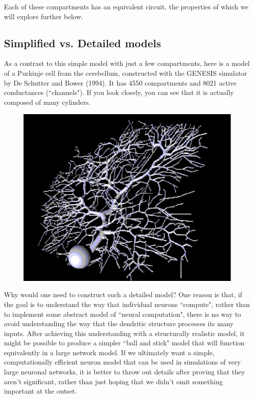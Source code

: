 \documentclass[12pt]{article}
\begin{document}
Each of these compartments has an equivalent circuit, the properties of which we will explore further below.

\subsection*{Simplified vs. Detailed models}

As a contrast to this simple model with just a few compartments, here is a model of a Purkinje cell from the cerebellum, constructed with the GENESIS simulator by De Schutter and Bower (1994). It has 4550 compartments and 8021 active conductances (``channels"). If you look closely, you can see that it is actually composed of many cylinders.

\begin{figure}[h]
  \centering
 \includegraphics[scale=0.5]{figures/purkcell.eps}
  \label{fig:purkcell}
\end{figure}

Why would one need to construct such a detailed model? One reason is that, if the goal is to understand the way that individual neurons ``compute", rather than to implement some abstract model of ``neural computation", there is no way to avoid understanding the way that the dendritic structure processes its many inputs. After achieving this understanding with a structurally realistic model, it might be possible to produce a simpler ``ball and stick" model that will function equivalently in a large network model. If we ultimately want a simple, computationally efficient neuron model that can be used in simulations of very large neuronal networks, it is better to throw out details after proving that they aren't significant, rather than just hoping that we didn't omit something important at the outset. 
\end{document}
